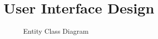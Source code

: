 \section{User Interface Design}

\begin{sidewaysfigure}
\begin{figure}[H]
\caption{Entity Class Diagram}
\label{fig:Class}
\centering

\end{figure}
\end{sidewaysfigure}

